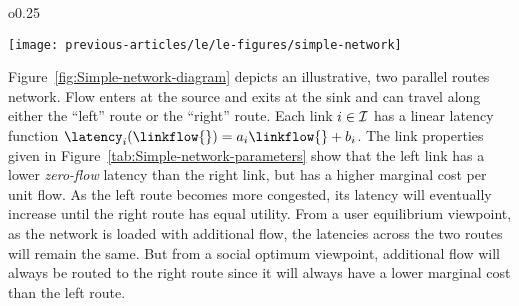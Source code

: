 \begin{wrapfigure}{o}{0.25\columnwidth}%
\begin{centering}
\texttt{[image: previous-articles/le/le-figures/simple-network]}
\par\end{centering}

\protect\caption{Network diagram\label{fig:Simple-network-diagram}}
\end{wrapfigure}%
Figure~\ref{fig:Simple-network-diagram} depicts an illustrative,
two parallel routes network. Flow enters at the source and exits at
the sink and can travel along either the ``left'' route or the ``right''
route. Each link $i\in\mathcal{I}$ has a linear latency function $\latency_{\link}\left(\linkflow{}\right)=a_{\link}\linkflow{}+b_{\link}$.
The link properties given in Figure~\ref{tab:Simple-network-parameters}
show that the left link has a lower \emph{zero-flow} latency than
the right link, but has a higher marginal cost per unit flow. As the
left route becomes more congested, its latency will eventually increase
until the right route has equal utility. From a user equilibrium viewpoint,
as the network is loaded with additional flow, the latencies across
the two routes will remain the same. But from a social optimum viewpoint,
additional flow will always be routed to the right route since it
will always have a lower marginal cost than the left route.
\begin{table}
\centering
{}\hfill%
\caption{Summary of illustrative network properties. \textbf{\ref{tab:Simple-network-parameters}}: Link-level input parameters. \textbf{\ref{tab:Demands}:} Network-level input demands}
\end{table}


